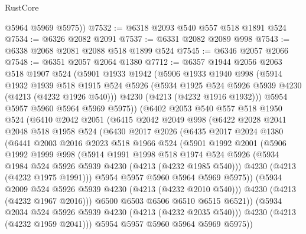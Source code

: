 \begin{lexlean}{RustCore}
\begin{coremodule}
        @5964
        @5969
        @5975))
@7532 := @6318 @2093 @540 @557 @518 @1891 @524
@7534 := @6326 @2082 @2091
@7537 := @6331 @2082 @2089 @998
@7543 := @6338 @2068 @2081 @2088 @518 @1899 @524
@7545 := @6346 @2057 @2066
@7548 := @6351 @2057 @2064 @1380
@7712 := @6357
    @1944
    @2056
    @2063
    @518
    @1907
    @524
    (@5901
      @1933
      @1942
      (@5906
        @1933
        @1940
        @998
        (@5914
          @1932
          @1939
          @518
          @1915
          @524
          @5926
          (@5934 @1925 @524 @5926 @5939 @4230 (@4213 (@4232 @1926 @540)))
          @4230
          (@4213 (@4232 @1916 @1932)))
        @5954
        @5957
        @5960
        @5964
        @5969
        @5975))
    (@6402
      @2053
      @540
      @557
      @518
      @1950
      @524
      (@6410
        @2042
        @2051
        (@6415
          @2042
          @2049
          @998
          (@6422
            @2028
            @2041
            @2048
            @518
            @1958
            @524
            (@6430
              @2017
              @2026
              (@6435
                @2017
                @2024
                @1380
                (@6441
                  @2003
                  @2016
                  @2023
                  @518
                  @1966
                  @524
                  (@5901
                    @1992
                    @2001
                    (@5906
                      @1992
                      @1999
                      @998
                      (@5914
                        @1991
                        @1998
                        @518
                        @1974
                        @524
                        @5926
                        (@5934 @1984 @524 @5926 @5939 @4230 (@4213 (@4232 @1985 @540)))
                        @4230
                        (@4213 (@4232 @1975 @1991)))
                      @5954
                      @5957
                      @5960
                      @5964
                      @5969
                      @5975))
                  (@5934 @2009 @524 @5926 @5939 @4230 (@4213 (@4232 @2010 @540)))
                  @4230
                  (@4213 (@4232 @1967 @2016)))
                @6500
                @6503
                @6506
                @6510
                @6515
                @6521))
            (@5934 @2034 @524 @5926 @5939 @4230 (@4213 (@4232 @2035 @540)))
            @4230
            (@4213 (@4232 @1959 @2041)))
          @5954
          @5957
          @5960
          @5964
          @5969
          @5975))

\end{coremodule}
\end{lexlean}
